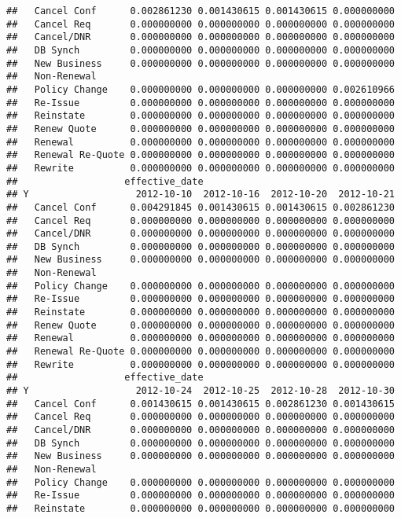 \documentclass[]{article}
\begin{document}
\begin{verbatim}
##   Cancel Conf      0.002861230 0.001430615 0.001430615 0.000000000
##   Cancel Req       0.000000000 0.000000000 0.000000000 0.000000000
##   Cancel/DNR       0.000000000 0.000000000 0.000000000 0.000000000
##   DB Synch         0.000000000 0.000000000 0.000000000 0.000000000
##   New Business     0.000000000 0.000000000 0.000000000 0.000000000
##   Non-Renewal                                                     
##   Policy Change    0.000000000 0.000000000 0.000000000 0.002610966
##   Re-Issue         0.000000000 0.000000000 0.000000000 0.000000000
##   Reinstate        0.000000000 0.000000000 0.000000000 0.000000000
##   Renew Quote      0.000000000 0.000000000 0.000000000 0.000000000
##   Renewal          0.000000000 0.000000000 0.000000000 0.000000000
##   Renewal Re-Quote 0.000000000 0.000000000 0.000000000 0.000000000
##   Rewrite          0.000000000 0.000000000 0.000000000 0.000000000
##                   effective_date
## Y                   2012-10-10  2012-10-16  2012-10-20  2012-10-21
##   Cancel Conf      0.004291845 0.001430615 0.001430615 0.002861230
##   Cancel Req       0.000000000 0.000000000 0.000000000 0.000000000
##   Cancel/DNR       0.000000000 0.000000000 0.000000000 0.000000000
##   DB Synch         0.000000000 0.000000000 0.000000000 0.000000000
##   New Business     0.000000000 0.000000000 0.000000000 0.000000000
##   Non-Renewal                                                     
##   Policy Change    0.000000000 0.000000000 0.000000000 0.000000000
##   Re-Issue         0.000000000 0.000000000 0.000000000 0.000000000
##   Reinstate        0.000000000 0.000000000 0.000000000 0.000000000
##   Renew Quote      0.000000000 0.000000000 0.000000000 0.000000000
##   Renewal          0.000000000 0.000000000 0.000000000 0.000000000
##   Renewal Re-Quote 0.000000000 0.000000000 0.000000000 0.000000000
##   Rewrite          0.000000000 0.000000000 0.000000000 0.000000000
##                   effective_date
## Y                   2012-10-24  2012-10-25  2012-10-28  2012-10-30
##   Cancel Conf      0.001430615 0.001430615 0.002861230 0.001430615
##   Cancel Req       0.000000000 0.000000000 0.000000000 0.000000000
##   Cancel/DNR       0.000000000 0.000000000 0.000000000 0.000000000
##   DB Synch         0.000000000 0.000000000 0.000000000 0.000000000
##   New Business     0.000000000 0.000000000 0.000000000 0.000000000
##   Non-Renewal                                                     
##   Policy Change    0.000000000 0.000000000 0.000000000 0.000000000
##   Re-Issue         0.000000000 0.000000000 0.000000000 0.000000000
##   Reinstate        0.000000000 0.000000000 0.000000000 0.000000000

\end{verbatim}
\end{document}
